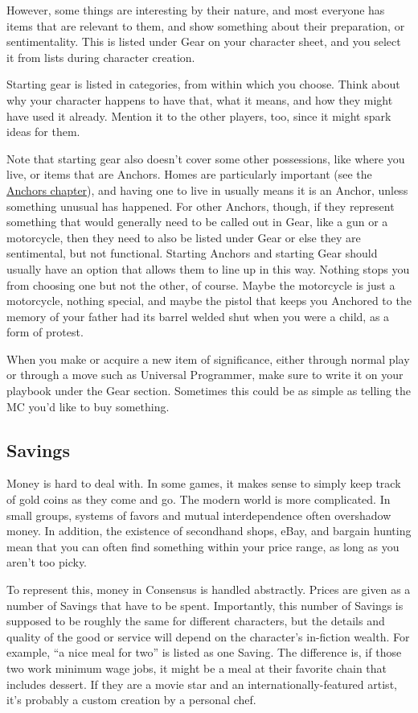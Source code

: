 \documentclass[
  oneside,
  statementpaper,
  9pt]{memoir}
\begin{document}
However, some things are interesting by their nature, and most everyone
has items that are relevant to them, and show something about their
preparation, or sentimentality. This is listed under Gear on your
character sheet, and you select it from lists during character creation.

Starting gear is listed in categories, from within which you choose.
Think about why your character happens to have that, what it means, and
how they might have used it already. Mention it to the other players,
too, since it might spark ideas for them.

Note that starting gear also doesn't cover some other possessions, like
where you live, or items that are Anchors. Homes are particularly
important (see the \href{AnchorsChapter}{Anchors chapter}), and having
one to live in usually means it is an Anchor, unless something unusual
has happened. For other Anchors, though, if they represent something
that would generally need to be called out in Gear, like a gun or a
motorcycle, then they need to also be listed under Gear or else they are
sentimental, but not functional. Starting Anchors and starting Gear
should usually have an option that allows them to line up in this way.
Nothing stops you from choosing one but not the other, of course. Maybe
the motorcycle is just a motorcycle, nothing special, and maybe the
pistol that keeps you Anchored to the memory of your father had its
barrel welded shut when you were a child, as a form of protest.

When you make or acquire a new item of significance, either through
normal play or through a move such as Universal Programmer, make sure to
write it on your playbook under the Gear section. Sometimes this could
be as simple as telling the MC you'd like to buy something.

\hypertarget{savings}{%
\subsection{Savings}\label{savings}}

Money is hard to deal with. In some games, it makes sense to simply keep
track of gold coins as they come and go. The modern world is more
complicated. In small groups, systems of favors and mutual
interdependence often overshadow money. In addition, the existence of
secondhand shops, eBay, and bargain hunting mean that you can often find
something within your price range, as long as you aren't too picky.

To represent this, money in Consensus is handled abstractly. Prices are
given as a number of Savings that have to be spent. Importantly, this
number of Savings is supposed to be roughly the same for different
characters, but the details and quality of the good or service will
depend on the character's in-fiction wealth. For example, ``a nice meal
for two'' is listed as one Saving. The difference is, if those two work
minimum wage jobs, it might be a meal at their favorite chain that
includes dessert. If they are a movie star and an
internationally-featured artist, it's probably a custom creation by a
personal chef.
\end{document}
